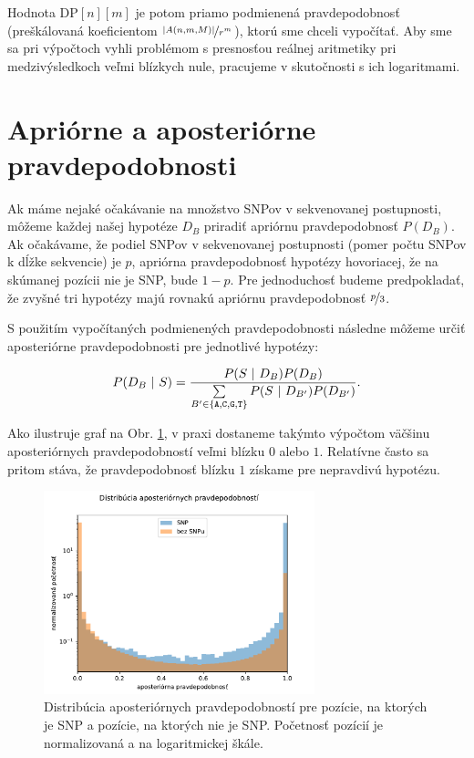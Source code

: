 Hodnota $\mathrm{DP}[n][m]$ je potom priamo podmienená pravdepodobnosť (preškálovaná koeficientom $\nicefrac{\abs*{A(n, m, M)}}{r^m}$),
 ktorú sme chceli vypočítať. Aby sme sa pri výpočtoch vyhli
problémom s presnosťou reálnej aritmetiky pri medzivýsledkoch veľmi blízkych nule, pracujeme v skutočnosti s ich
logaritmami.

\section{Apriórne a aposteriórne pravdepodobnosti}

Ak máme nejaké očakávanie na množstvo SNPov v sekvenovanej postupnosti, môžeme
každej našej hypotéze $D_B$ priradiť apriórnu pravdepodobnosť $P(D_B)$.
Ak očakávame, že podiel SNPov v sekvenovanej postupnosti (pomer počtu SNPov k dĺžke sekvencie) je $p$, 
apriórna pravdepodobnosť hypotézy hovoriacej, že na skúmanej pozícii nie je SNP, bude $1-p$.  Pre 
jednoduchosť budeme predpokladať, že zvyšné tri hypotézy majú rovnakú apriórnu pravdepodobnosť 
$\nicefrac{p}{3}$.

S použitím vypočítaných 
podmienených 
pravdepodobnosti následne môžeme určiť aposteriórne pravdepodobnosti pre jednotlivé hypotézy:

$$P(D_B ~|~ S) = \frac{P(S ~|~ D_B) P(D_B)}{\sum\limits_{B' \in \bazy}  P(S ~|~ D_{B'}) P(D_{B'})} 
\text{.}$$

Ako ilustruje graf na Obr. \ref{fig:aposteriori_noroot}, v praxi dostaneme takýmto výpočtom väčšinu aposteriórnych pravdepodobností veľmi blízku $0$ alebo $1$. Relatívne často
sa pritom stáva, že pravdepodobnosť blízku $1$ získame pre nepravdivú hypotézu.

\begin{figure}[t]
\centerline{\includegraphics[width=0.7\textwidth]{plots/0_noroot_eqbins}}
\caption[Aposteriórne pravdepodobnosti pre pozície so SNPom a pozície bez SNPu]{Distribúcia aposteriórnych pravdepodobností pre pozície, na ktorých je SNP a pozície, na ktorých nie je SNP. Početnosť
pozícií je normalizovaná a na logaritmickej škále.}
\label{fig:aposteriori_noroot}
\end{figure}


